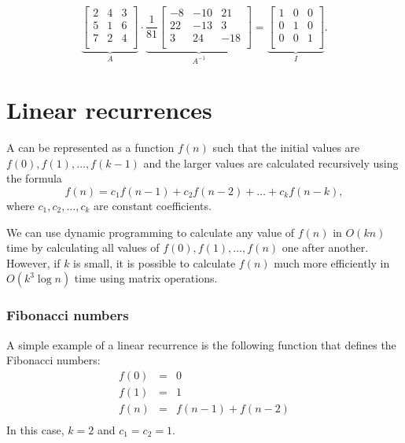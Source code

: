 \[
\underbrace{
 \begin{bmatrix}
  2 & 4 & 3\\
  5 & 1 & 6\\
  7 & 2 & 4\\
 \end{bmatrix}
}_{A}
\cdot
\underbrace{
 \frac{1}{81}
 \begin{bmatrix}
   -8 & -10 & 21 \\
   22 & -13 & 3 \\
   3 & 24 & -18 \\
 \end{bmatrix}
}_{A^{-1}}
=
\underbrace{
 \begin{bmatrix}
  1 & 0 & 0 \\
  0 & 1 & 0 \\
  0 & 0 & 1 \\
 \end{bmatrix}
}_{I}.
\]

\section{Linear recurrences}


A 
can be represented as a function $f(n)$
such that the initial values are
$f(0),f(1),\ldots,f(k-1)$
and the larger values
are calculated recursively using the formula
\[f(n) = c_1 f(n-1) + c_2 f(n-2) + \ldots + c_k f (n-k),\]
where $c_1,c_2,\ldots,c_k$ are constant coefficients.

We can use dynamic programming to calculate
any value of $f(n)$ in $O(kn)$ time by calculating
all values of $f(0),f(1),\ldots,f(n)$ one after another.
However, if $k$ is small, it is possible to calculate
$f(n)$ much more efficiently in $O(k^3 \log n)$
time using matrix operations.

\subsubsection{Fibonacci numbers}


A simple example of a linear recurrence is the
following function that defines the Fibonacci numbers:
\[
\begin{array}{lcl}
f(0) & = & 0 \\
f(1) & = & 1 \\
f(n) & = & f(n-1)+f(n-2) \\
\end{array}
\]
In this case, $k=2$ and $c_1=c_2=1$.

